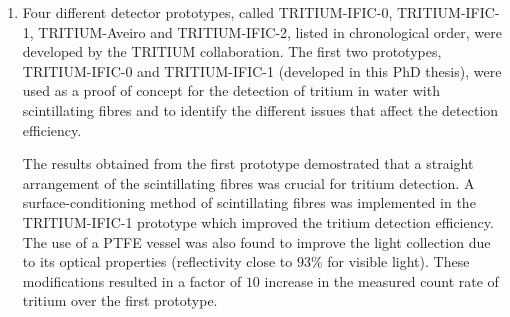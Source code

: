 \begin{enumerate}

\item{} Four different detector prototypes, called TRITIUM-IFIC-0, TRITIUM-IFIC-1, TRITIUM-Aveiro and TRITIUM-IFIC-2, listed in chronological order, were developed by the TRITIUM collaboration. The first two prototypes, TRITIUM-IFIC-0 and TRITIUM-IFIC-1 (developed in this PhD thesis), were used as a proof of concept for the detection of tritium in water with scintillating fibres and to identify the different issues that affect the detection efficiency. %

The results obtained from the first prototype demostrated that a straight arrangement of the scintillating fibres was crucial for tritium detection. A surface-conditioning method of scintillating fibres was implemented in the TRITIUM-IFIC-1 prototype which improved the tritium detection efficiency. The use of a PTFE vessel was also found to improve the light collection due to its optical properties (reflectivity close to $93\%$ for visible light). These modifications resulted in a factor of $10$ increase in the measured count rate of tritium over the first prototype. %


\end{enumerate}
